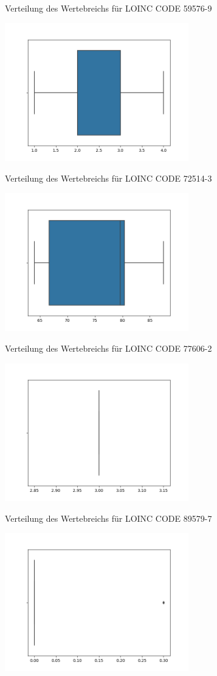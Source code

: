 \documentclass[12pt,a4paper,toc=bibliographynumbered,toc=indenttextentries]{scrreprt}
\begin{document}
\begin{center}
			\small{Verteilung des Wertebreichs für LOINC CODE 59576-9}
			
			\includegraphics[width=8cm]{Graphs/72514-3.png}
			
			\small{Verteilung des Wertebreichs für LOINC CODE 72514-3}
			
			\includegraphics[width=8cm]{Graphs/77606-2.png}
			
			\small{Verteilung des Wertebreichs für LOINC CODE 77606-2}
			
			\includegraphics[width=8cm]{Graphs/89579-7.png}
			
			\small{Verteilung des Wertebreichs für LOINC CODE 89579-7}
			
			\includegraphics[width=8cm]{Graphs/273249006.png}
			

\end{center}
\end{document}
